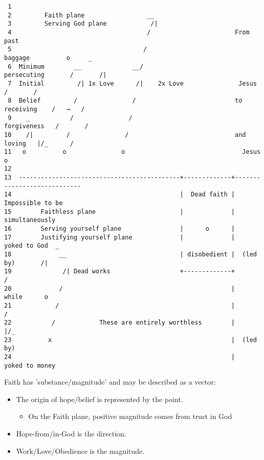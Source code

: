 \documentclass[11pt]{article}
\begin{document}
\begin{verbatim}
 1  
 2         Faith plane                 __
 3         Serving God plane            /|
 4                                     /                       From past
 5                                    /                          baggage          o     _
 6  Minimum        __              __/                         persecuting       /       /|
 7  Initial         /| 1x Love      /|    2x Love               Jesus           /       /
 8  Belief         /               /                           to receiving    /   →   /
 9    _           /               /                             forgiveness   /       /
10    /|         /               /                             and loving   |/_      /
11   o          o               o                                Jesus              o
12  
13  --------------------------------------------+-------------+----------------------------
14                                              |  Dead faith |    Impossible to be
15        Faithless plane                       |             |     simultaneously
16        Serving yourself plane                |      o      |
17        Justifying yourself plane             |             |   yoked to God  _
18             __                               | disobedient |  (led by)       /|
19              /| Dead works                   +-------------+                /
20             /                                              |    while      o
21            /                                               |              /
22           /            These are entirely worthless        |            |/_
23          x                                                 |  (led by)
24                                                            |   yoked to money
\end{verbatim}

Faith has 'substance/magnitude' and may be described as a vector:
\begin{itemize}
\item The origin of hope/belief is represented by the point.
\begin{itemize}
\item On the Faith plane, positive magnitude comes from trust in God
\end{itemize}
\item Hope-from/in-God is the direction.
\item Work/Love/Obedience is the magnitude.
\end{itemize}
\end{document}
